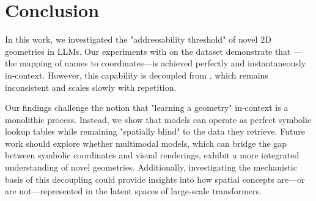 \section{Conclusion}
\label{sec:conclusion}

In this work, we investigated the "addressability threshold" of novel 2D geometries in LLMs. Our experiments with \gpt on the \kilogram dataset demonstrate that \addressing—the mapping of names to coordinates—is achieved perfectly and instantaneously in-context. However, this capability is decoupled from \reasoning, which remains inconsistent and scales slowly with repetition.

Our findings challenge the notion that "learning a geometry" in-context is a monolithic process. Instead, we show that models can operate as perfect symbolic lookup tables while remaining "spatially blind" to the data they retrieve. Future work should explore whether multimodal models, which can bridge the gap between symbolic coordinates and visual renderings, exhibit a more integrated understanding of novel geometries. Additionally, investigating the mechanistic basis of this decoupling could provide insights into how spatial concepts are—or are not—represented in the latent spaces of large-scale transformers.
